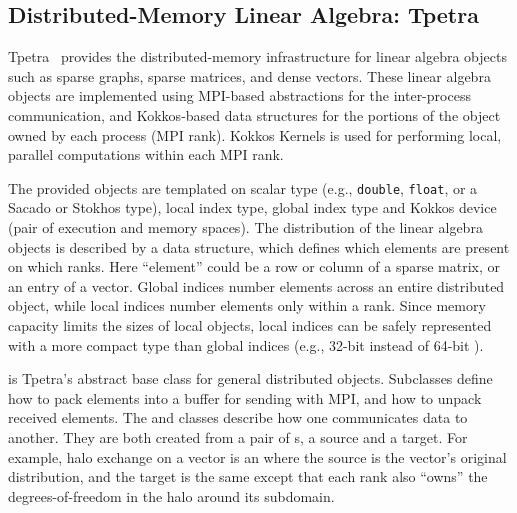 \subsection{Distributed-Memory Linear Algebra: Tpetra}\label{subsec:tpetra}
Tpetra~\cite{Baker2012,hoemmen2015tpetra} provides the distributed-memory
infrastructure for linear algebra objects such as sparse graphs,
sparse matrices, and dense vectors. These linear algebra objects are
implemented using MPI-based abstractions for the inter-process communication,
and Kokkos-based data structures for the portions of the object
owned by each process (MPI rank). Kokkos Kernels is used for
performing local, parallel computations within each MPI rank.

The provided objects are templated on scalar type (e.g., \texttt{double}, \texttt{float}, or a Sacado or Stokhos type), local index type, global index type and Kokkos device (pair of execution and memory spaces).
The distribution of the linear algebra objects is described by a  data structure, which defines which elements are present on which ranks.
Here ``element'' could be a row or column of a sparse matrix, or an entry of a vector.
Global indices number elements across an entire distributed object, while local indices number elements only within a rank.
Since memory capacity limits the sizes of local objects, local indices can be safely represented with a more compact type than global indices (e.g., 32-bit  instead of 64-bit ).

 is Tpetra's abstract base class for general distributed objects.
Subclasses define how to pack elements into a buffer for sending with MPI, and how to unpack received elements.
The  and  classes describe how one  communicates data to another.
They are both created from a pair of s, a source and a target. For example, halo exchange on a vector is an  where
the source is the vector's original distribution, and the target is the same except that each rank
also ``owns'' the degrees-of-freedom in the halo around its subdomain.

